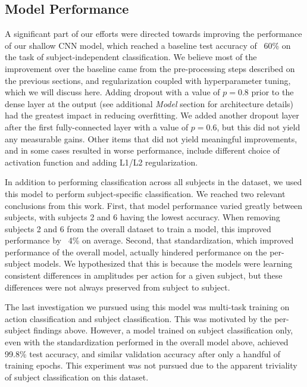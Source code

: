 \documentclass[10pt,twocolumn,letterpaper]{article}
\begin{document}
\subsection{Model Performance}
A significant part of our efforts were directed towards improving the
performance of our shallow CNN model, which reached a baseline test accuracy of
~60\% on the task of subject-independent classification. 
We believe most of the improvement over the baseline came from the
pre-processing steps described on the previous sections, and regularization
coupled with hyperparameter tuning, which we will discuss here.
Adding dropout with a value of $p=0.8$ prior to the dense
layer at the output (see additional \emph{Model} section for architecture
details) had the greatest impact in reducing overfitting. 
We added another dropout layer after the first fully-connected layer with a
value of $p=0.6$, but this did not yield any measurable gains.
Other items that did not yield meaningful improvements, and in some cases
resulted in worse performance, include different choice of activation function
and adding L1/L2 regularization.

In addition to performing classification across all subjects in the dataset, we
used this model to perform subject-specific classification. We reached two
relevant conclusions from this work. First, that model performance varied
greatly between subjects, with subjects 2 and 6 having the lowest accuracy. When
removing subjects 2 and 6 from the overall dataset to train a model, this
improved performance by ~4\% on average.
Second, that standardization, which improved performance of the overall model,
actually hindered performance on the per-subject models. We hypothesized that
this is because the models were learning consistent differences in amplitudes
per action for a given subject, but these differences were not always preserved
from subject to subject.

The last investigation we pursued using this model was multi-task training on
action classification and subject classification. This was motivated by the
per-subject findings above. However, a model trained on subject classification
only, even with the standardization performed in the overall model above,
achieved 99.8\% test accuracy, and similar validation accuracy after only a
handful of training epochs. This experiment was not pursued due to the apparent
triviality of subject classification on this dataset. 
\end{document}
